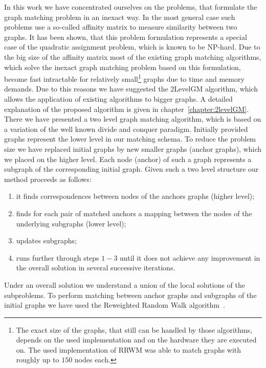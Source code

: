In this work we have concentrated ourselves on the problems, that formulate the graph matching problem in an inexact way. 
In the most general case such problems use a so-called affinity matrix to measure similarity between two graphs. 
It has been shown, that this problem formulation represents a special case of the quadratic assignment problem, which is known to be NP-hard. Due to the big size of the affinity matrix most of the existing graph matching algorithms, which solve the inexact graph matching problem based on this formulation, become fast intractable for relatively small\footnote{The exact size of the graphs, that still can be handled by those algorithms, depends on the used implementation and on the hardware they are executed on. The used implementation of RRWM was able to match graphs with roughly up to $150$ nodes each.} graphs due to time and memory demands. Due to this reasons we have suggested the 2LevelGM algorithm, which allows the application of existing algorithms to bigger graphs. A detailed explanation of the proposed algorithm is given in chapter~\ref{chapter:2levelGM}. There we have presented a two level graph matching algorithm, which is based on a variation of the well known divide and conquer paradigm. Initially provided graphs represent the lower level in our matching schema. To reduce the problem size we have replaced initial graphs by new smaller graphs (anchor graphs), which we placed on the higher level. Each node (anchor) of such a graph represents a subgraph of the corresponding initial graph. Given such a two level structure our method proceeds as follows:
\begin{enumerate}
\item it finds correspondences between nodes of the anchors graphs (higher level);
\item finds for each pair of matched anchors a mapping between the nodes of the underlying subgraphs (lower level);
\item updates subgraphs;
\item runs further through steps $1-3$ until it does not achieve any improvement in the overall solution in several successive iterations.
\end{enumerate}
Under an overall solution we understand a union of the local solutions of the subproblems. To perform matching between anchor graphs and subgraphs of the initial graphs we have used the Reweighted Random Walk algorithm~\cite{Cho2010_RRWM}.

